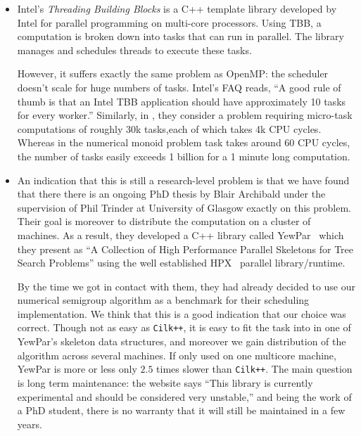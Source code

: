 \documentclass{deliverablereport}
\newcommand{\CilkP}{\texttt{Cilk++}\xspace}
\begin{document}
\begin{itemize}
  Unfortunately, for tcomputations like numerical semigroups, there
  is a huge number of small tasks that are spawned. We used the implementation
  from the GCC compiler. At the time of our experiment, the finding was that the
  scheduler doesn't scale to this huge number of tasks required. The scheduling overhead
  was several order of magnitude larger than \CilkP making it unusable for
  these kinds of computations.

\item Intel's \emph{Threading Building Blocks} is a C++ template library
  developed by Intel for parallel programming on multi-core processors. Using
  TBB, a computation is broken down into tasks that can run in parallel. The
  library manages and schedules threads to execute these tasks.

  However, it suffers exactly the same problem as OpenMP: the scheduler
  doesn't scale for huge numbers of tasks. Intel's FAQ reads, ``A good rule of
  thumb is that an Intel TBB application should have approximately 10 tasks
  for every worker.'' Similarly, in \cite{LuLi}, they consider a problem
  requiring micro-task computations of roughly 30k tasks,each of which takes 4k
  CPU cycles. Whereas in the numerical monoid problem task takes around 60
  CPU cycles, the number of tasks easily exceeds 1 billion for a 1 minute long
  computation.  

\item An indication that this is still a research-level problem is that we
  have found that there there is an ongoing PhD thesis by Blair Archibald under
  the supervision of Phil Trinder at University of Glasgow exactly on this
  problem. Their goal is moreover to distribute the computation on a cluster
  of machines. As a result, they developed a C++ library called
  YewPar~\cite{YewPar} which they present as ``A Collection of High
  Performance Parallel Skeletons for Tree Search Problems'' using the well
  established HPX~\cite{HPX} parallel library/runtime.

  By the time we got in contact with them, they had already decided to use our numerical
  semigroup algorithm as a benchmark for their scheduling implementation. We
  think that this is a good indication that our choice was correct. Though not
  as easy as \CilkP, it is easy to fit the task into in one of YewPar's skeleton data structures, and moreover
  we gain distribution of the algorithm across several machines. If only used on
  one multicore machine, YewPar is more or less only $2.5$ times slower than
  \CilkP. The main question is long term maintenance: the website says ``This
  library is currently experimental and should be considered very unstable,''
  and being the work of a PhD student, there is no warranty that it will
  still be maintained in a few years.


\end{itemize}
\end{document}
